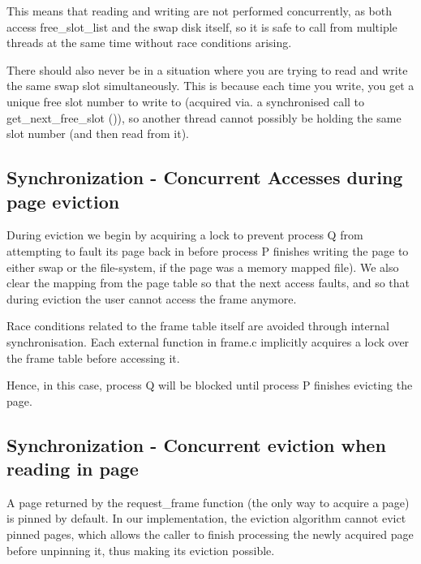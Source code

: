 This means that reading and writing are not performed concurrently, as both access free\_slot\_list and the swap disk itself, so it is safe to call from multiple threads at the same time without race conditions arising.

There should also never be in a situation where you are trying to read and write the same swap slot simultaneously. This is because each time you write, you get a unique free slot number to write to (acquired via. a synchronised call to get\_next\_free\_slot ()), so another thread cannot possibly be holding the same slot number (and then read from it).

\subsection{Synchronization - Concurrent Accesses during page eviction}

During eviction we begin by acquiring a lock to prevent process Q from attempting to fault its page back in before process P finishes writing the page to either swap or the file-system, if the page was a memory mapped file). We also clear the mapping from the page table so that the next access faults, and so that during eviction the user cannot access the frame anymore.

Race conditions related to the frame table itself are avoided through internal synchronisation. Each external function in frame.c implicitly acquires a lock over the frame table before accessing it.

Hence, in this case, process Q will be blocked until process P finishes evicting the page.

\subsection{Synchronization - Concurrent eviction when reading in page}

A page returned by the request\_frame function (the only way to acquire a page) is pinned by default.
In our implementation, the eviction algorithm cannot evict pinned pages, which allows the caller to finish processing the newly acquired page before unpinning it, thus making its eviction possible.

